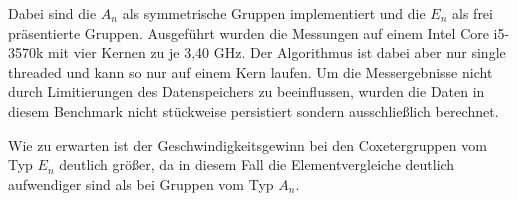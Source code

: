Dabei sind die $A_n$ als
symmetrische Gruppen implementiert und die $E_n$ als frei präsentierte Gruppen.
Ausgeführt wurden die Messungen auf einem Intel Core i5-3570k mit vier Kernen
zu je 3,40 GHz. Der Algorithmus ist dabei aber nur single threaded und kann so
nur auf einem Kern laufen. Um die Messergebnisse nicht durch Limitierungen des
Datenspeichers zu beeinflussen, wurden die Daten in diesem Benchmark nicht
stückweise persistiert sondern ausschließlich berechnet.

Wie zu erwarten ist der Geschwindigkeitsgewinn bei den Coxetergruppen vom Typ
$E_n$ deutlich größer, da in diesem Fall die Elementvergleiche deutlich
aufwendiger sind als bei Gruppen vom Typ $A_n$.

